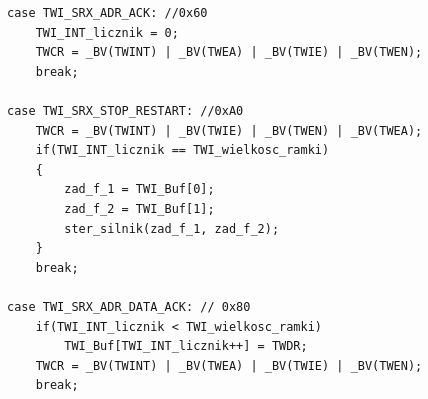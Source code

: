 \begin{lstlisting}
case TWI_SRX_ADR_ACK: //0x60
	TWI_INT_licznik = 0;
	TWCR = _BV(TWINT) | _BV(TWEA) | _BV(TWIE) | _BV(TWEN);
	break;
	
case TWI_SRX_STOP_RESTART: //0xA0
	TWCR = _BV(TWINT) | _BV(TWIE) | _BV(TWEN) | _BV(TWEA);
	if(TWI_INT_licznik == TWI_wielkosc_ramki)
	{
		zad_f_1 = TWI_Buf[0];
		zad_f_2 = TWI_Buf[1];
		ster_silnik(zad_f_1, zad_f_2);
	}
	break;

case TWI_SRX_ADR_DATA_ACK: // 0x80
	if(TWI_INT_licznik < TWI_wielkosc_ramki)
		TWI_Buf[TWI_INT_licznik++] = TWDR;
	TWCR = _BV(TWINT) | _BV(TWEA) | _BV(TWIE) | _BV(TWEN);
	break;
\end{lstlisting}


